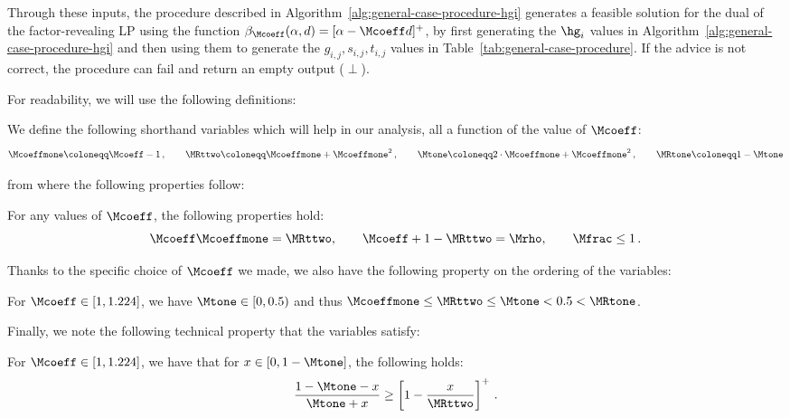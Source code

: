 Through these inputs, the procedure described in Algorithm~\ref{alg:general-case-procedure-hgi} generates a feasible solution for the dual of the factor-revealing LP using the function $\beta_{\Mcoeff}(\alpha,d) = [\alpha - \Mcoeff d]^+$, by first generating the $\hg_i$ values in Algorithm~\ref{alg:general-case-procedure-hgi} and then using them to generate the $g_{i,j}, s_{i,j}, t_{i,j}$ values in Table~\ref{tab:general-case-procedure}. If the advice is not correct, the procedure can fail and return an empty output ($\perp$). 

For readability, we will use the following definitions:
\begin{definition}
    We define the following shorthand variables which will help in our analysis, all a function of the value of $\Mcoeff$:
    \begin{align*}
        \Mcoeffmone \coloneqq \Mcoeff - 1\,,
        \qquad
        \MRttwo \coloneqq \Mcoeffmone + \Mcoeffmone^2\,,
        \qquad
        \Mtone \coloneqq 2\cdot \Mcoeffmone + \Mcoeffmone^2\,,
        \qquad
        \MRtone \coloneqq 1-\Mtone
    \end{align*}
\end{definition}
from where the following properties follow:
\begin{property}\label{property:coefficients}
    For any values of $\Mcoeff$, the following properties hold:
    \begin{equation*}
        \Mcoeff \Mcoeffmone = \MRttwo, \qquad \Mcoeff + 1 - \MRttwo = \Mrho, \qquad \Mfrac \leq 1\,.
    \end{equation*}
\end{property}
Thanks to the specific choice of $\Mcoeff$ we made, we also have the following property on the ordering of the variables:
\begin{property}\label{property:thresholds}
    For $\Mcoeff \in [1,1.224]$, we have $\Mtone \in [0,0.5)$ and thus $\Mcoeffmone \leq \MRttwo \leq \Mtone < 0.5 < \MRtone$.
\end{property}
Finally, we note the following technical property that the variables satisfy:
\begin{property}\label{property:function-tau}
    For $\Mcoeff \in [1,1.224]$, we have that for $x\in[0,1-\Mtone]$, the following holds:
    \begin{equation*}    
        \frac{1-\Mtone-x}{\Mtone + x} \geq \left[1-\frac{x}{\MRttwo}\right]^+\,.
    \end{equation*}
\end{property}


